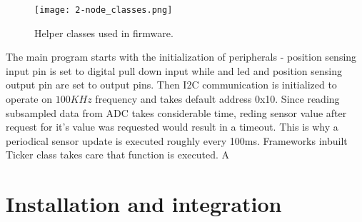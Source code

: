 \begin{figure}[h]
  \begin{center}
    \texttt{[image: 2-node\_classes.png]}
  \end{center}
  \caption{Helper classes used in firmware.}
  \label{fig:node_classes}
\end{figure}

The main program starts with the initialization of peripherals - position sensing input pin is set to digital pull down input while and led and position sensing output pin are set to output pins. Then I2C communication is initialized to operate on $100KHz$ frequency and takes default address 0x10. Since reading subsampled data from \ac{ADC} takes considerable time, reding sensor value after request for it's value was requested would result in a timeout. This is why a periodical sensor update is executed roughly every 100ms. Frameworks inbuilt Ticker class takes care that function  is executed. A 


\section{Installation and integration}

